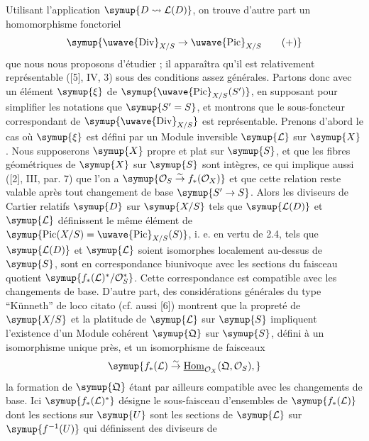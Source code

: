 Utilisant l'application $\symup{D\rightsquigarrow\mathcal L(D)}$, on trouve d'autre part un
homomorphisme fonctoriel
\begin{equation}
\symup{\text{\uwave{Div}}_{X/S}\to\text{\uwave{Pic}}_{X/S}
\tag{+}}
\end{equation}
que nous nous proposons d'étudier ; il apparaîtra qu'il est relativement
représentable ([5], IV, 3) sous des conditions assez générales. Partons donc
avec un élément $\symup{\xi}$ de $\symup{\text{\uwave{Pic}}_{X/S}(S')}$, en supposant pour
simplifier les notations que $\symup{S'=S}$, et montrons que le sous-foncteur
correspondant de $\symup{\text{\uwave{Div}}_{X/S}}$ est représentable. Prenons d'abord
le cas où $\symup{\xi}$ est défini par un Module inversible $\symup{\mathcal L}$ sur $\symup{X}$. Nous
supposerons $\symup{X}$ propre et plat sur $\symup{S}$, et que les fibres géométriques de $\symup{X}$
sur $\symup{S}$ sont intègres, ce qui implique aussi ([2], III, par. 7) que l'on a
$\symup{\mathcal O_S\overset{\sim}{\to}f_*(\mathcal O_X)}$ et que cette relation reste
valable après tout changement de base $\symup{S'\to S}$. Alors les
diviseurs de Cartier relatifs $\symup{D}$ sur $\symup{X/S}$ tels que $\symup{\mathcal L(D)}$ et
$\symup{\mathcal L}$ définissent le même élément de
$\symup{\operatorname{Pic}(X/S)=\text{\uwave{Pic}}_{X/S}(S)}$, i. e. en vertu de 2.4,
tels que $\symup{\mathcal L(D)}$ et $\symup{\mathcal L}$ soient isomorphes localement au-dessus
de $\symup{S}$, sont en correspondance biunivoque avec les sections du faisceau
quotient $\symup{f_*(\mathcal L)^*/\mathcal O_S^*}$. Cette correspondance est compatible
avec les changements de base. D'autre part, des considérations générales du
type ``Künneth'' de loco citato (cf. aussi [6]) montrent que la propreté de
$\symup{X/S}$ et la platitude de $\symup{\mathcal L}$ sur $\symup{S}$ impliquent l'existence d'un Module
cohérent $\symup{\mathfrak Q}$ sur $\symup{S}$, défini à un isomorphisme unique près, et un
isomorphisme de faisceaux
\[
\symup{f_*(\mathcal L)\overset{\sim}{\to}
\underline{\operatorname{Hom}}_{\mathcal O_X}(\mathfrak Q,\mathcal O_S),}
\]
la formation de $\symup{\mathfrak Q}$ étant par ailleurs
compatible avec les changements de base. Ici $\symup{f_*(\mathcal L)^*}$ désigne le
sous-faisceau d'ensembles de $\symup{f_*(\mathcal L)}$ dont les sections sur $\symup{U}$ sont
les sections de $\symup{\mathcal L}$ sur $\symup{f^{-1}(U)}$ qui définissent des diviseurs de

